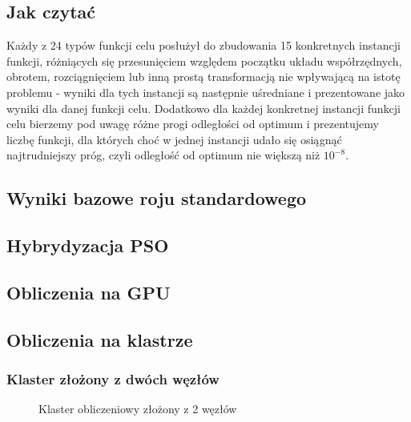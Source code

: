 \documentclass[12pt, twoside, openany, abstract=on]{report}
\theoremstyle{definition}
\begin{document}
\subsection{Jak czytać}
Każdy z 24 typów funkcji celu posłużył do zbudowania 15 konkretnych instancji funkcji, różniących się przesunięciem względem początku układu współrzędnych, obrotem, rozciągnięciem lub inną prostą transformacją nie wpływającą na istotę problemu - wyniki dla tych instancji są następnie uśredniane i prezentowane jako wyniki dla danej funkcji celu. Dodatkowo dla każdej konkretnej instancji funkcji celu bierzemy pod uwagę różne progi odległości od optimum i prezentujemy liczbę funkcji, dla których choć w jednej instancji udało się osiągnąć najtrudniejszy próg, czyli odległość od optimum nie większą niż $10^{-8}$.


\subsection{Wyniki bazowe roju standardowego}

\subsection{Hybrydyzacja PSO}

\subsection{Obliczenia na GPU}

\subsection{Obliczenia na klastrze}

\subsubsection{Klaster złożony z dwóch węzłów}
\begin{figure}[H]
    \centering
 \caption{Klaster obliczeniowy złożony z 2 węzłów}
\end{figure}
\end{document}
